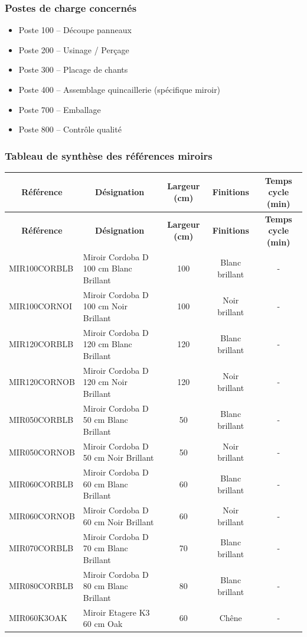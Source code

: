 \documentclass[12pt,a4paper]{article}
\begin{document}
\subsubsection{Postes de charge concernés}
\begin{itemize}
    \item Poste 100 – Découpe panneaux
    \item Poste 200 – Usinage / Perçage
    \item Poste 300 – Placage de chants
    \item Poste 400 – Assemblage quincaillerie (spécifique miroir)
    \item Poste 700 – Emballage
    \item Poste 800 – Contrôle qualité
\end{itemize}

\subsubsection{Tableau de synthèse des références miroirs}

\begin{longtable}{|p{4cm}|p{5cm}|c|c|c|}
\hline
\multicolumn{1}{|c|}{\textbf{Référence}} & \multicolumn{1}{c|}{\textbf{Désignation}} & \multicolumn{1}{c|}{\textbf{Largeur (cm)}} & \multicolumn{1}{c|}{\textbf{Finitions}} & \multicolumn{1}{c|}{\textbf{Temps cycle (min)}} \\
\hline
\endfirsthead
\hline
\multicolumn{1}{|c|}{\textbf{Référence}} & \multicolumn{1}{c|}{\textbf{Désignation}} & \multicolumn{1}{c|}{\textbf{Largeur (cm)}} & \multicolumn{1}{c|}{\textbf{Finitions}} & \multicolumn{1}{c|}{\textbf{Temps cycle (min)}} \\
\hline
\endhead
\hline
\endfoot
MIR100CORBLB & Miroir Cordoba D 100 cm Blanc Brillant & 100 & Blanc brillant & - \\
MIR100CORNOI & Miroir Cordoba D 100 cm Noir Brillant & 100 & Noir brillant & - \\
MIR120CORBLB & Miroir Cordoba D 120 cm Blanc Brillant & 120 & Blanc brillant & - \\
MIR120CORNOB & Miroir Cordoba D 120 cm Noir Brillant & 120 & Noir brillant & - \\
MIR050CORBLB & Miroir Cordoba D 50 cm Blanc Brillant & 50 & Blanc brillant & - \\
MIR050CORNOB & Miroir Cordoba D 50 cm Noir Brillant & 50 & Noir brillant & - \\
MIR060CORBLB & Miroir Cordoba D 60 cm Blanc Brillant & 60 & Blanc brillant & - \\
MIR060CORNOB & Miroir Cordoba D 60 cm Noir Brillant & 60 & Noir brillant & - \\
MIR070CORBLB & Miroir Cordoba D 70 cm Blanc Brillant & 70 & Blanc brillant & - \\
MIR080CORBLB & Miroir Cordoba D 80 cm Blanc Brillant & 80 & Blanc brillant & - \\
MIR060K3OAK & Miroir Etagere K3 60 cm Oak & 60 & Chêne & - \\
\hline
\end{longtable}
\end{document}
